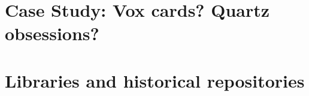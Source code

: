 
\section{Case Study: Vox cards? Quartz obsessions?}


\section{Libraries and historical repositories}

